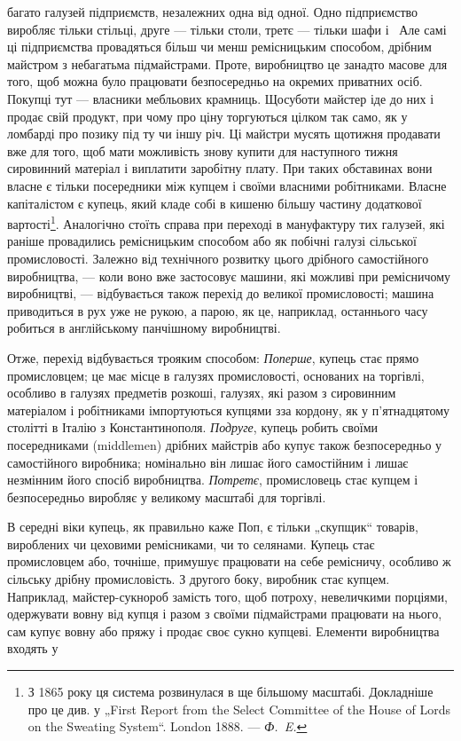 \parcont{}  %
багато галузей підприємств, незалежних одна від одної. Одно
підприємство виробляє тільки стільці, друге — тільки столи,
третє — тільки шафи і~ Але самі ці підприємства провадяться
більш чи менш ремісницьким способом, дрібним майстром з небагатьма
підмайстрами. Проте, виробництво це занадто масове для
того, щоб можна було працювати безпосередньо на окремих
приватних осіб. Покупці тут — власники мебльових крамниць.
Щосуботи майстер іде до них і продає свій продукт, при чому
про ціну торгуються цілком так само, як у ломбарді про позику
під ту чи іншу річ. Ці майстри мусять щотижня продавати вже
для того, щоб мати можливість знову купити для наступного
тижня сировинний матеріал і виплатити заробітну плату. При
таких обставинах вони власне є тільки посередники між купцем
і своїми власними робітниками. Власне капіталістом є купець,
який кладе собі в кишеню більшу частину додаткової вартості\footnote{
З 1865 року ця система розвинулася в ще більшому масштабі. Докладніше
про це див. у „First Report from the Select Committee of the House of Lords on
the Sweating System“. London 1888. — \emph{Ф.~E.}
}.
Аналогічно стоїть справа при переході в мануфактуру тих галузей,
які раніше провадились ремісницьким способом або як
побічні галузі сільської промисловості. Залежно від технічного
розвитку цього дрібного самостійного виробництва, — коли воно
вже застосовує машини, які можливі при ремісничому виробництві,
— відбувається також перехід до великої промисловості;
машина приводиться в рух уже не рукою, а парою, як це, наприклад,
останнього часу робиться в англійському панчішному
виробництві.

Отже, перехід відбувається трояким способом: \emph{Поперше},
купець стає прямо промисловцем; це має місце в галузях промисловості,
основаних на торгівлі, особливо в галузях предметів
розкоші, галузях, які разом з сировинним матеріалом і робітниками
імпортуються купцями зза кордону, як у п’ятнадцятому
столітті в Італію з Константинополя. \emph{Подруге}, купець робить
своїми посередниками (middlemen) дрібних майстрів або купує
також безпосередньо у самостійного виробника; номінально
він лишає його самостійним і лишає незмінним його спосіб виробництва.
\emph{Потретє}, промисловець стає купцем і безпосередньо
виробляє у великому масштабі для торгівлі.

В середні віки купець, як правильно каже Поп, є тільки
„скупщик“ товарів, вироблених чи цеховими ремісниками, чи то
селянами. Купець стає промисловцем або, точніше, примушує
працювати на себе ремісничу, особливо ж сільську дрібну промисловість.
З другого боку, виробник стає купцем. Наприклад,
майстер-сукнороб замість того, щоб потроху, невеличкими
порціями, одержувати вовну від купця і разом з своїми підмайстрами
працювати на нього, сам купує вовну або пряжу і
продає своє сукно купцеві. Елементи виробництва входять у
\parbreak{}  %
